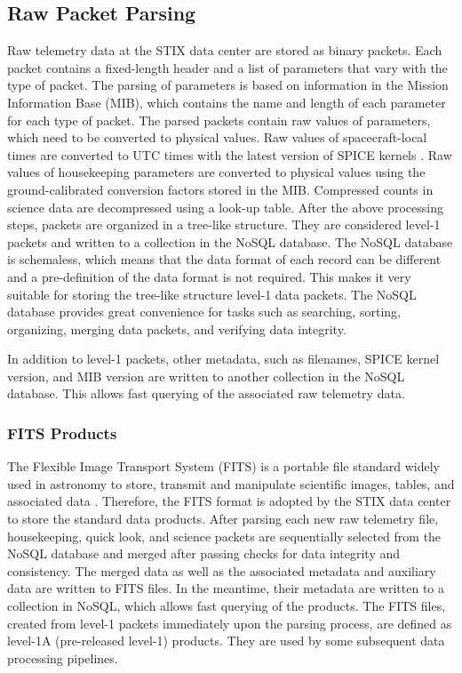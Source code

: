 \documentclass[referee]{preaa} %
\begin{document}
\subsection{Raw Packet Parsing}
Raw telemetry data at the STIX data center are stored as binary packets. 
Each packet contains a fixed-length header and a list of parameters that vary with the type of packet.  The parsing of parameters is based on information in the Mission Information Base (MIB), which contains the name and length of each parameter for each type of packet. 
The parsed packets contain raw values of parameters, which need to be converted to physical values. 
Raw values of spacecraft-local times are converted to UTC times with the latest version of SPICE kernels \citep{spice1996,spice2018,spicedoi}.  Raw values of housekeeping parameters are converted to physical values using the ground-calibrated conversion factors stored in the MIB. 
Compressed counts in science data are decompressed using a look-up table. 
After the above processing steps, packets are organized in a tree-like structure. 
They are considered level-1 packets and written to a collection in the NoSQL database. 
The NoSQL database is schemaless, which means that the data format of each record can be different and a pre-definition of the data format is not required.
This makes it very suitable for storing the tree-like structure level-1 data packets.  
The NoSQL database provides great convenience  for tasks such as searching, sorting, organizing, merging data packets, and verifying data integrity.

In addition to level-1 packets, other metadata, such as filenames, SPICE kernel version, and MIB version are written to another collection in the NoSQL database.
This allows fast querying of the associated raw telemetry data.

\subsubsection{FITS Products}
The Flexible Image Transport System (FITS) is a portable file standard widely used in astronomy to store, transmit and manipulate scientific images, tables, and associated data \citep{fits}.
Therefore, the FITS format is adopted by the STIX data center to store the standard data products. 
After parsing each new raw telemetry file, housekeeping, quick look, and science packets are sequentially selected from the NoSQL database and merged after passing checks for data integrity and consistency.  The merged data as well as the associated metadata and auxiliary data are written to FITS files.  In the meantime, their metadata are written to a collection in NoSQL, which allows fast querying of the products. The FITS files, created from level-1 packets immediately upon the parsing process, are defined as level-1A (pre-released level-1) products.  They are used by some subsequent data processing pipelines.  
\end{document}
